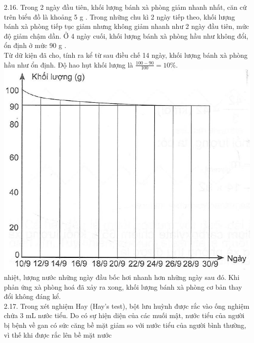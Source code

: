 \documentclass[10pt]{article}
\begin{document}
2.16. Trong 2 ngày đầu tiên, khối lượng bánh xà phòng giảm nhanh nhất, căn cứ trên biểu đồ là khoảng 5 g . Trong những chu kì 2 ngày tiếp theo, khối lượng bánh xà phòng tiếp tục giảm nhưng không giảm nhanh như 2 ngày đầu tiên, mức độ giảm chậm dần. Ở 4 ngày cuối, khối lượng bánh xà phòng hầu như không đổi, ổn định ở mức 90 g .\\
Từ dữ kiện đã cho, tính ra kể từ sau điều chế 14 ngày, khối lượng bánh xà phòng hầu như ổn định. Độ hao hụt khối lượng là $\frac{100-90}{100}=10 \%$.\\
\includegraphics[max width=\textwidth]{2025_10_23_b4e16b74380d0f7e7700g-011} nhiệt, lượng nước những ngày đầu bốc hơi nhanh hơn những ngày sau đó. Khi phản ứng xà phòng hoá đã xảy ra xong, khối lượng bánh xà phòng cơ bản thay đổi không đáng kể.\\
2.17. Trong xét nghiệm Hay (Hay's test), bột lưu huỳnh được rắc vào ống nghiệm chứa 3 mL nước tiểu. Do có sự hiện diện của các muối mật, nước tiểu của người bị bệnh về gan có sức căng bề mặt giảm so với nước tiểu của người bình thường, vì thế khi được rắc lên bề mặt nước
\end{document}
